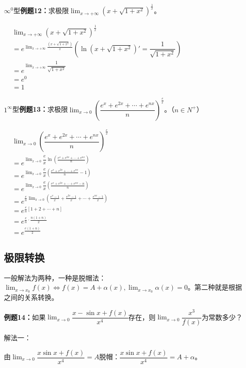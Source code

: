 \documentclass[UTF8]{ctexart}
\begin{document}
$\infty^0$型\textbf{例题12：}求极限$\lim_{x\to+\infty}(x+\sqrt{1+x^2})^{\frac{1}{x}}$。

$
\begin{aligned}
    & \lim_{x\to+\infty}(x+\sqrt{1+x^2})^{\frac{1}{x}} \\
    & =e^{\lim_{x\to+\infty}\frac{(x+\sqrt{1+x^2})}{x}} \left(\ln(x+\sqrt{1+x^2})'=\dfrac{1}{\sqrt{1+x^2}}\right) \\
    & =e^{\lim_{x\to+\infty}\dfrac{1}{\sqrt{1+x^2}}} \\
    & =e^0 \\
    & =1
\end{aligned}
$

$1^\infty$型\textbf{例题13：}求极限$\lim_{x\to 0}\left(\dfrac{e^x+e^{2x}+\cdots+e^{nx}}{n}\right)^{\frac{e}{x}}$。（$n\in N^+$）

$
\begin{aligned}
    & \lim_{x\to 0}\left(\dfrac{e^x+e^{2x}+\cdots+e^{nx}}{n}\right)^{\frac{e}{x}} \\
    & =e^{\lim_{x\to 0}\dfrac{e}{x}\ln\left(\frac{e^x+e^{2x}+\cdots+e^{nx}}{n}\right)} \\
    & =e^{\lim_{x\to 0}\dfrac{e}{x}\left(\frac{e^x+e^{2x}+\cdots+e^{nx}}{n}-1\right)} \\
    & =e^{\lim_{x\to 0}\dfrac{e}{x}\left(\frac{e^x+e^{2x}+\cdots+e^{nx}-n}{n}\right)} \\
    & =e^{\frac{e}{n}\lim_{x\to 0}\left(\frac{e^x-1}{x}+\frac{e^{2x}-1}{x}+\cdots+\frac{e^{nx}-1}{x}\right)} \\
    & =e^{\frac{e}{n}[1+2+\cdots+n]} \\
    & =e^{\frac{e}{n}\cdot\frac{n(1+n)}{2}} \\
    & =e^{\frac{e(1+n)}{2}}
\end{aligned}
$

\subsection{极限转换}

一般解法为两种，一种是脱帽法：$\lim_{x\to x_0}f(x)\Leftrightarrow f(x)=A+\alpha(x),\lim_{x\to x_0}\alpha(x)=0$。第二种就是根据之间的关系转换。

\textbf{例题14：}如果$\lim_{x\to 0}\dfrac{x-\sin x+f(x)}{x^4}$存在，则$\lim_{x\to 0}\dfrac{x^3}{f(x)}$为常数多少？

解法一：

由$\lim_{x\to 0}\dfrac{x\sin x+f(x)}{x^4}=A$脱帽：$\dfrac{x\sin x+f(x)}{x^4}=A+\alpha$。
\end{document}
